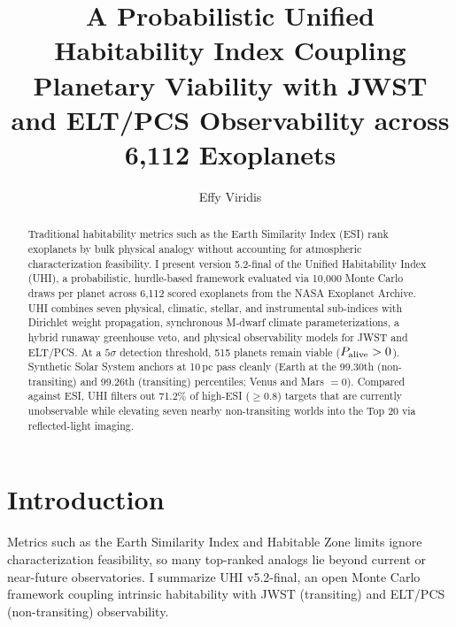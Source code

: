 \documentclass{aastex702}
\begin{document}
\title{A Probabilistic Unified Habitability Index Coupling Planetary Viability with JWST and ELT/PCS Observability across 6,112 Exoplanets}

\author[0009-0004-5620-5352,gname=Effy,sname=Viridis]{Effy Viridis}

\begin{abstract}
Traditional habitability metrics such as the Earth Similarity Index (ESI) rank exoplanets by bulk physical analogy without accounting for atmospheric characterization feasibility. I present version 5.2-final of the Unified Habitability Index (UHI), a probabilistic, hurdle-based framework evaluated via 10,000 Monte Carlo draws per planet across 6,112 scored exoplanets from the NASA Exoplanet Archive. UHI combines seven physical, climatic, stellar, and instrumental sub-indices with Dirichlet weight propagation, synchronous M-dwarf climate parameterizations, a hybrid runaway greenhouse veto, and physical observability models for JWST and ELT/PCS. At a $5\sigma$ detection threshold, 515 planets remain viable ($P_{\rm alive} > 0$). Synthetic Solar System anchors at 10\,pc pass cleanly (Earth at the 99.30th (non-transiting) and 99.26th (transiting) percentiles; Venus and Mars $= 0$). Compared against ESI, UHI filters out 71.2\% of high-ESI ($\geq 0.8$) targets that are currently unobservable while elevating seven nearby non-transiting worlds into the Top 20 via reflected-light imaging.
\end{abstract}


\section{Introduction}

Metrics such as the Earth Similarity Index \citep[ESI;][]{SchulzeMakuch2011} and Habitable Zone limits \citep{Kopparapu2013} ignore characterization feasibility, so many top-ranked analogs lie beyond current or near-future observatories. I summarize UHI v5.2-final, an open Monte Carlo framework coupling intrinsic habitability with JWST (transiting) and ELT/PCS (non-transiting) observability.
\end{document}
